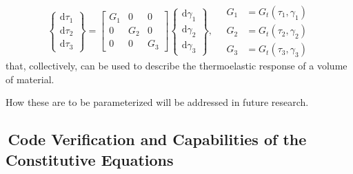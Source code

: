 \begin{displaymath}
    \left\{ \begin{matrix}
    \mathrm{d} \tau_1 \\ \mathrm{d} \tau_2 \\ \mathrm{d} \tau_3
    \end{matrix} \right\} = \begin{bmatrix}
    G_1 & 0 & 0 \\ 0 & G_2 & 0 \\ 0 & 0 & G_3
    \end{bmatrix} \left\{ \begin{matrix}
    \mathrm{d} \gamma_1 \\ \mathrm{d} \gamma_2 \\ \mathrm{d} \gamma_3
    \end{matrix} \right\} , \quad
    \begin{aligned}
    G_1 & = G_t ( \tau_1 , \gamma_1 ) \\
    G_2 & = G_t ( \tau_2 , \gamma_2 ) \\
    G_3 & = G_t ( \tau_3 , \gamma_3 )
    \end{aligned}
\end{displaymath}
that, collectively, can be used to describe the thermo\-elastic response of a volume of material.  

How these are to be parameterized will be addressed in future research.


\subsection{$\,$Code Verification and Capabilities of the Constitutive Equations}
\label{secCE_verifyCode}

